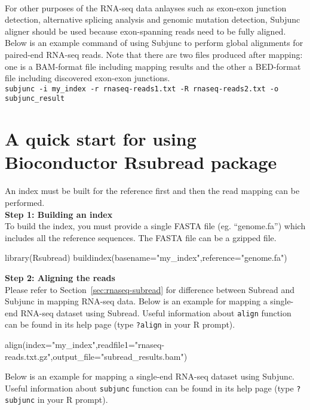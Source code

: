 \documentclass[12pt]{report}
\newcommand{\code}[1]{{\small\texttt{#1}}}
\newcommand{\Subread}{\textsf{Subread}}
\newcommand{\Subjunc}{\textsf{Subjunc}}
\newcommand{\Rsubread}{\textsf{Rsubread}}
\newcommand{\R}{\textsf{R}}
\begin{document}
\noindent{{\Subjunc}}\\

For other purposes of the RNA-seq data anlayses such as exon-exon junction detection, alternative splicing analysis and genomic mutation detection, {\Subjunc} aligner should be used because exon-spanning reads need to be fully aligned.
Below is an example command of using {\Subjunc} to perform global alignments for paired-end RNA-seq reads.
Note that there are two files produced after mapping: one is a BAM-format file including mapping results and the other a BED-format file including discovered exon-exon junctions.\\

\code{subjunc -i my\_index -r rnaseq-reads1.txt -R rnaseq-reads2.txt -o subjunc\_result}

\section{A quick start for using Bioconductor {\Rsubread} package}

An index must be built for the reference first and then the read mapping can be performed.\\

{\noindent\bf Step 1: Building an index}\\

\noindent To build the index, you must provide a single FASTA file (eg. ``genome.fa'') which includes all the reference sequences.
The FASTA file can be a gzipped file.

\begin{Rcode}
library(Rsubread)
buildindex(basename="my_index",reference="genome.fa")
\end{Rcode}

{\noindent\bf Step 2: Aligning the reads}\\

Please refer to Section~\ref{sec:rnaseq-subread} for difference between {\Subread} and {\Subjunc} in mapping RNA-seq data.
Below is an example for mapping a single-end RNA-seq dataset using {\Subread}.
Useful information about \code{align} function can be found in its help page (type \code{?align} in your {\R} prompt).

\begin{Rcode}
align(index="my_index",readfile1="rnaseq-reads.txt.gz",output_file="subread_results.bam")
\end{Rcode}

Below is an example for mapping a single-end RNA-seq dataset using {\Subjunc}.
Useful information about \code{subjunc} function can be found in its help page (type \code{?subjunc} in your {\R} prompt).
\end{document}
